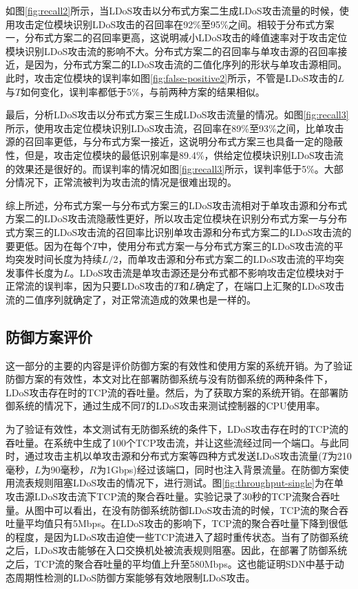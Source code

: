 如图\ref{fig:recall2}所示，当LDoS攻击以分布式方案二生成LDoS攻击流量的时候，使用攻击定位模块识别LDoS攻击的召回率在92\%至95\%之间。相较于分布式方案一，分布式方案二的召回率更高，这说明减小LDoS攻击的峰值速率对于攻击定位模块识别LDoS攻击流的影响不大。分布式方案二的召回率与单攻击源的召回率接近，是因为，分布式方案二的LDoS攻击流的二值化序列的形状与单攻击源相同。此时，攻击定位模块的误判率如图\ref{fig:false-positive2}所示，不管是LDoS攻击的$L$与$T$如何变化，误判率都低于5\%，与前两种方案的结果相似。

最后，分析LDoS攻击以分布式方案三生成LDoS攻击流量的情况。如图\ref{fig:recall3}所示，使用攻击定位模块识别LDoS攻击流，召回率在89\%至93\%之间，比单攻击源的召回率更低，与分布式方案一接近，这说明分布式方案三也具备一定的隐蔽性，但是，攻击定位模块的最低识别率是89.4\%，供给定位模块识别LDoS攻击流的效果还是很好的。而误判率的情况如图\ref{fig:recall3}所示，误判率低于5\%。大部分情况下，正常流被判为攻击流的情况是很难出现的。

综上所述，分布式方案一与分布式方案三的LDoS攻击流相对于单攻击源和分布式方案二的LDoS攻击流隐蔽性更好，所以攻击定位模块在识别分布式方案一与分布式方案三的LDoS攻击流的召回率比识别单攻击源和分布式方案二的LDoS攻击流的要更低。因为在每个$T$中，使用分布式方案一与分布式方案三的LDoS攻击流的平均突发时间长度为持续$L/2$，而单攻击源和分布式方案二的LDoS攻击流的平均突发事件长度为$L$。LDoS攻击流是单攻击源还是分布式都不影响攻击定位模块对于正常流的误判率，因为只要LDoS攻击的$T$和$L$确定了，在端口上汇聚的LDoS攻击流的二值序列就确定了，对正常流造成的效果也是一样的。


\subsection{防御方案评价}
\label{chap05:evaluaion}

这一部分的主要的内容是评价防御方案的有效性和使用方案的系统开销。为了验证防御方案的有效性，本文对比在部署防御系统与没有防御系统的两种条件下，LDoS攻击存在时的TCP流的吞吐量。然后，为了获取方案的系统开销。在部署防御系统的情况下，通过生成不同$T$的LDoS攻击来测试控制器的CPU使用率。

为了验证有效性，本文测试有无防御系统的条件下，LDoS攻击存在时的TCP流的吞吐量。在系统中生成了100个TCP攻击流，并让这些流经过同一个端口。与此同时，通过攻击主机以单攻击源和分布式方案等四种方式发送LDoS攻击流量($T$为210毫秒，$L$为90毫秒，$R$为1Gbps)经过该端口，同时也注入背景流量。在防御方案使用流表规则阻塞LDoS攻击的情况下，进行测试。图\ref{fig:throughput-single}为在单攻击源LDoS攻击流下TCP流的聚合吞吐量。实验记录了30秒的TCP流聚合吞吐量。从图中可以看出，在没有防御系统防御LDoS攻击流的时候，TCP流的聚合吞吐量平均值只有5Mbps。在LDoS攻击的影响下，TCP流的聚合吞吐量下降到很低的程度，是因为LDoS攻击迫使一些TCP流进入了超时重传状态。当有了防御系统之后，LDoS攻击能够在入口交换机处被流表规则阻塞。因此，在部署了防御系统之后，TCP流的聚合吞吐量的平均值上升至580Mbps。这也能证明SDN中基于动态周期性检测的LDoS防御方案能够有效地限制LDoS攻击。

